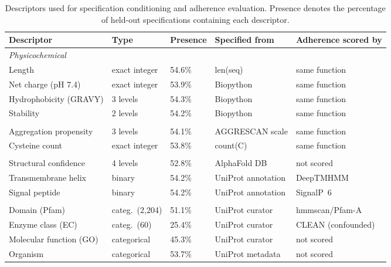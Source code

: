 \documentclass{article}
\newcommand{\pct}{\%}
\begin{document}
\begin{table}[h]
\caption{Descriptors used for specification conditioning and adherence
evaluation. Presence denotes the percentage of held-out specifications
containing each descriptor.}
\label{tab:descriptors}
\centering
\footnotesize
\begin{tabular}{lllll}
\toprule
Descriptor & Type & Presence & Specified from & Adherence scored by \\
\midrule
\multicolumn{5}{l}{\emph{Physicochemical}}\\
\quad Length                  & exact integer & 54.6\pct & len(seq)   & same function \\
\quad Net charge (pH 7.4)     & exact integer & 53.9\pct & Biopython           & same function \\
\quad Hydrophobicity (GRAVY)  & 3 levels      & 54.3\pct & Biopython           & same function \\
\quad Stability               & 2 levels      & 54.2\pct & Biopython           & same function \\
\addlinespace
\multicolumn{5}{l}{\emph{Developability}}\\
\quad Aggregation propensity  & 3 levels      & 54.1\pct & AGGRESCAN scale     & same function \\
\quad Cysteine count          & exact integer & 53.8\pct & count(C)   & same function \\
\addlinespace
\multicolumn{5}{l}{\emph{Structural and topological}}\\
\quad Structural confidence   & 4 levels      & 52.8\pct & AlphaFold DB        & not scored \\
\quad Transmembrane helix     & binary        & 54.2\pct & UniProt annotation  & DeepTMHMM \\
\quad Signal peptide          & binary        & 54.2\pct & UniProt annotation  & SignalP~6 \\
\addlinespace
\multicolumn{5}{l}{\emph{Functional}}\\
\quad Domain (Pfam)           & categ.\ (2{,}204) & 51.1\pct & UniProt curator & hmmscan/Pfam-A \\
\quad Enzyme class (EC)       & categ.\ (60)      & 25.4\pct & UniProt curator & CLEAN (confounded) \\
\quad Molecular function (GO) & categorical       & 45.3\pct & UniProt curator & not scored \\
\quad Organism                & categorical       & 53.7\pct & UniProt metadata & not scored \\
\bottomrule
\end{tabular}
\end{table}
\end{document}

